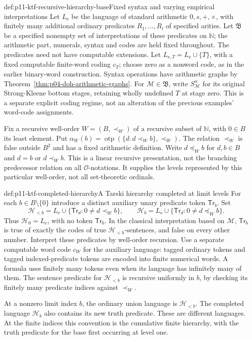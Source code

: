 \begin{hbconvention}{def:p11-ktf-recursive-hierarchy-base}{Fixed syntax and varying empirical interpretations}
Let \(L_{\mathrm e}\) be the language of standard arithmetic
\(0,s,+,\times\), with finitely many additional ordinary
predicates \(R_1,\ldots,R_l\) of specified arities. Let
\(\mathfrak B\) be a specified nonempty set of interpretations
of these predicates on \(\mathbb N\); the arithmetic part,
numerals, syntax and codes are held fixed throughout. The predicates
need not have computable extensions. Let
\(L_{\mathrm e,T}=L_{\mathrm e}\cup\{T\}\), with a fixed
computable finite-word coding \(c_T\); choose zero as a nonword
code, as in the earlier binary-word construction. Syntax operations
have arithmetic graphs by Theorem~\ref{thm:p04-doh-arithmetic-graphs}.
For \(\mathcal M\in\mathfrak B\), write
\(S_{\mathcal M}^\alpha\) for its original Strong-Kleene
bottom stages, retaining wholly undefined \(T\) at stage zero.
This is a separate explicit coding regime, not an alteration of the
previous examples' word-code assignments.

Fix a recursive well-order \(W=(B,\prec_W)\) of a recursive
subset of \(\mathbb N\), with \(0\in B\) its least
element. Put
\(\alpha_W(b)=\operatorname{otp}(\{d:d\prec_W b\},\prec_W)\).
The relation \(\prec_W\) is false outside \(B^2\) and
has a fixed arithmetic definition. Write \(d\preceq_W b\)
for \(d,b\in B\) and \(d=b\) or \(d\prec_W b\).
This is a linear recursive
presentation, not the branching predecessor relation on all
\(\mathcal O\)-notations. It supplies the levels represented
by this particular well-order, not all set-theoretic ordinals.
\end{hbconvention}

\begin{hbdefinition}{def:p11-ktf-completed-hierarchy}{A Tarski hierarchy completed at limit levels}
For each \(b\in B\setminus\{0\}\) introduce a distinct
auxiliary unary predicate token \(\mathsf{Tr}_b\). Set
\[
 \mathcal H_{<b}=L_{\mathrm e}\cup
       \{\mathsf{Tr}_d:0\ne d\prec_W b\},\qquad
 \mathcal H_b=L_{\mathrm e}\cup
       \{\mathsf{Tr}_d:0\ne d\preceq_W b\}.
\]
Thus \(\mathcal H_0=L_{\mathrm e}\), with no token
\(\mathsf{Tr}_0\). In the classical interpretation based on
\(\mathcal M\), \(\mathsf{Tr}_b\) is true of exactly the
codes of true \(\mathcal H_{<b}\)-sentences, and false on
every other number. Interpret these predicates by well-order recursion.
Use a separate computable word code \(c_W\) for the auxiliary
language: tagged ordinary tokens and tagged indexed-predicate tokens
are encoded into finite numerical words. A formula uses finitely
many tokens even when its language has infinitely many of them.
The sentence predicate for \(\mathcal H_{<b}\) is recursive
uniformly in \(b\), by checking its finitely many predicate
indices against \(\prec_W\).

At a nonzero limit index \(b\), the ordinary union language is
\(\mathcal H_{<b}\). The completed language \(\mathcal H_b\)
also contains its new truth predicate. These are different languages.
At the finite indices this convention is the cumulative finite
hierarchy, with the truth predicate for the base first occurring
at level one.
\end{hbdefinition}

